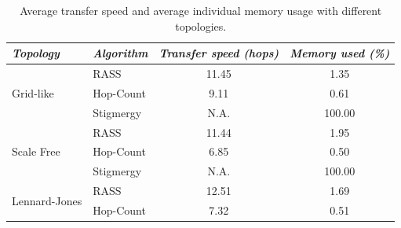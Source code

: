 \begin{table}[htbp]
\centering
\caption[RASS performance summary for different topologies]{Average transfer speed and average individual memory usage with different topologies.}

\begin{tabular}{|l|l|c|c|}
\hline\rowcolor[gray]{0.8}\color{black}
\textit{Topology} & \textit{Algorithm} & \textit{Transfer speed (hops)} & \textit{Memory used  (\%)} \\ \hline
\multirow{3}{*}{Grid-like}            & \ac{RASS}                                   & 11.45                                                                     & 1.35                                                                 \\
                                      & Hop-Count                              & 9.11                                                                      & 0.61                                                                 \\
                                      & Stigmergy                              & N.A.                                                                      & 100.00                                                               \\ \hline
\multirow{3}{*}{Scale Free}           & \ac{RASS}                                   & 11.44                                                                     & 1.95                                                                 \\
                                      & Hop-Count                              & 6.85                                                                      & 0.50                                                                 \\
                                      & Stigmergy                              & N.A.                                                                      & 100.00                                                               \\ \hline
\multirow{3}{*}{Lennard-Jones}        & \ac{RASS}                                   & 12.51                                                                     & 1.69                                                                 \\
                                      & Hop-Count                              & 7.32                                                                      & 0.51                                                                 \\

\end{tabular}
\end{table}
